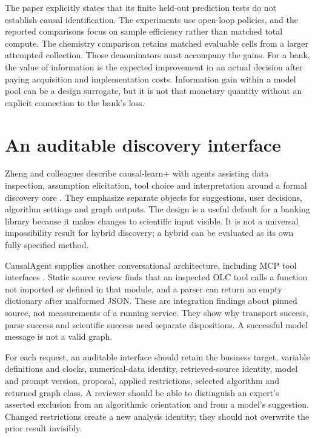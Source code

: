 The paper explicitly states that its finite held-out prediction tests do not
establish causal identification. The experiments use open-loop policies, and
the reported comparisons focus on sample efficiency rather than matched total
compute. The chemistry comparison retains matched evaluable cells from a
larger attempted collection. Those denominators must accompany the gains.
For a bank, the value of information is the expected improvement in an actual
decision after paying acquisition and implementation costs. Information gain
within a model pool can be a design surrogate, but it is not that monetary
quantity without an explicit connection to the bank's loss.

\section{An auditable discovery interface}

Zheng and colleagues describe causal-learn+ with agents assisting data
inspection, assumption elicitation, tool choice and interpretation around a
formal discovery core \cite{v12_la_2606_23608}. They emphasize separate
objects for suggestions, user decisions, algorithm settings and graph outputs.
The design is a useful default for a banking library because it makes changes
to scientific input visible. It is not a universal impossibility result for
hybrid discovery; a hybrid can be evaluated as its own fully specified method.

CausalAgent supplies another conversational architecture, including MCP tool
interfaces \cite{v12_la_2602_11527}. Static source review finds that an
inspected OLC tool calls a function not imported or defined in that module,
and a parser can return an empty dictionary after malformed JSON. These are
integration findings about pinned source, not measurements of a running
service. They show why transport success, parse success and scientific success
need separate dispositions. A successful model message is not a valid graph.

For each request, an auditable interface should retain the business target,
variable definitions and clocks, numerical-data identity, retrieved-source
identity, model and prompt version, proposal, applied restrictions, selected
algorithm and returned graph class. A reviewer should be able to distinguish
an expert's asserted exclusion from an algorithmic orientation and from a
model's suggestion. Changed restrictions create a new analysis identity;
they should not overwrite the prior result invisibly.

